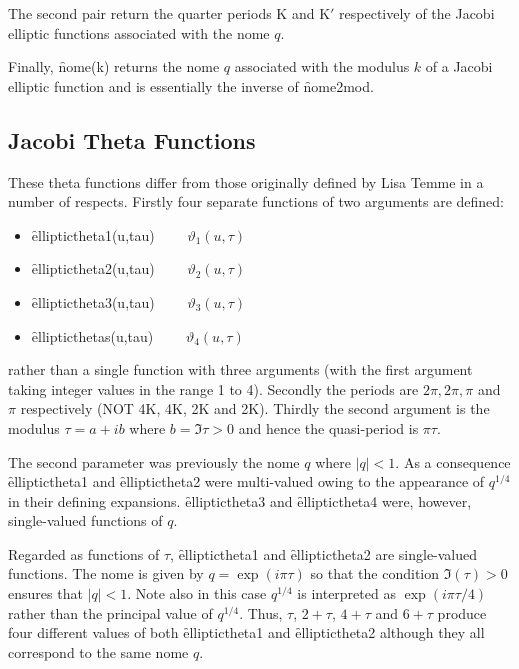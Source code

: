The second pair return the quarter periods K and K$'$ respectively of
the Jacobi elliptic functions associated with the nome $q$.

Finally, \f{nome(k)} returns the nome $q$ associated with the modulus $k$ of
a Jacobi elliptic function and is essentially the inverse of \f{nome2mod}.

\subsection{Jacobi Theta Functions}
\hypertarget{JACTF}{}
These theta functions differ from those originally defined by Lisa Temme
in a number of respects.
Firstly four separate functions of two arguments are defined:
\hypertarget{operator:ELLIPTICTHETA1}{}
\hypertarget{operator:ELLIPTICTHETA2}{}
\hypertarget{operator:ELLIPTICTHETA3}{}
\hypertarget{operator:ELLIPTICTHETA4}{}
 
 
\begin{itemize}
\item \f{elliptictheta1(u,tau)} $\qquad \vartheta_1(u, \tau)$
\item \f{elliptictheta2(u,tau)} $\qquad \vartheta_2(u, \tau)$
\item \f{elliptictheta3(u,tau)} $\qquad \vartheta_3(u, \tau)$
\item \f{ellipticthetas(u,tau)} $\qquad \vartheta_4(u, \tau)$
\end{itemize}

rather than a single function with three arguments (with the first argument
taking integer values in the range 1 to 4).
Secondly the periods are $2\pi, 2\pi, \pi$ and $\pi$ respectively
(NOT 4K, 4K, 2K and 2K).
Thirdly the second argument is the modulus $\tau = a+i b$ where $b=\Im\tau>0$
and hence the quasi-period is $\pi\tau$.

The second parameter was previously the nome $q$
where $|q|<1$. As a consequence \f{elliptictheta1} and \f{elliptictheta2} were
multi-valued owing to the appearance of $q^{1/4}$ in their defining expansions.
\f{elliptictheta3} and \f{elliptictheta4} were, however, single-valued
functions of $q$.

Regarded as functions of $\tau$,
\f{elliptictheta1} and \f{elliptictheta2} are single-valued functions. The nome
is given by $q = \exp(i\pi\tau)$  so that the condition $\Im(\tau)>0$ ensures
that $|q| < 1$. Note also  in this case $q^{1/4}$ is interpreted as
$\exp(i\pi\tau/4)$ rather than the principal value of $q^{1/4}$.
Thus, $\tau$, $2+\tau$, $4+\tau$ and $6+\tau$ produce four different values of
both \f{elliptictheta1} and \f{elliptictheta2} although they all correspond to
the same nome $q$.

